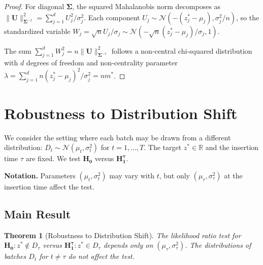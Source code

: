 \documentclass{article}
\theoremstyle{plain}
\newtheorem{theorem}{Theorem}[section]
\theoremstyle{definition}
\theoremstyle{remark}
\newcommand{\bs}{\boldsymbol}
\newcommand{\RR}{\ensuremath{\mathbb{R}}}
\newcommand{\cN}{\ensuremath{\mathcal{N}}}
\begin{document}
\begin{proof}
    For diagonal $\bs\Sigma$, the squared Mahalanobis norm decomposes as $\|\mathbf{U}\|_{\bs\Sigma^{-1}}^2 = \sum_{j=1}^d U_j^2/\sigma_j^2$. Each component $U_j \sim \cN(-(z_j^* - \mu_j), \sigma_j^2/n)$, so the standardized variable $W_j = \sqrt{n} U_j/\sigma_j \sim \cN(-\sqrt{n}(z_j^* - \mu_j)/\sigma_j, 1)$.
    
    The sum $\sum_{j=1}^d W_j^2 = n \|\mathbf{U}\|_{\bs\Sigma^{-1}}^2$ follows a non-central chi-squared distribution with $d$ degrees of freedom and non-centrality parameter $\lambda = \sum_{j=1}^d n(z_j^* - \mu_j)^2/\sigma_j^2 = n m^*$.
\end{proof}




\section{Robustness to Distribution Shift}
\label{app:shift-robustness-proof}

We consider the setting where each batch may be drawn from a different distribution: $D_t \sim \cN(\mu_t, \sigma_t^2)$ for $t = 1, \ldots, T$. The target $z^* \in \RR$ and the insertion time $\tau$ are fixed. We test $\mathbf{H_0}$ versus $\mathbf{H_1^\tau}$.

\textbf{Notation.} Parameters $(\mu_t, \sigma_t^2)$ may vary with $t$, but only $(\mu_\tau, \sigma_\tau^2)$ at the insertion time affect the test.

\subsection{Main Result}
\label{app:proof-shift-robustness}

\begin{theorem}[Robustness to Distribution Shift]
    \label{thm:shift-robustness}
    The likelihood ratio test for $\mathbf{H_0}: z^* \notin D_\tau$ versus $\mathbf{H_1^\tau}: z^* \in D_\tau$ depends only on $(\mu_\tau, \sigma_\tau^2)$. The distributions of batches $D_t$ for $t \neq \tau$ do not affect the test.
\end{theorem}
\end{document}
